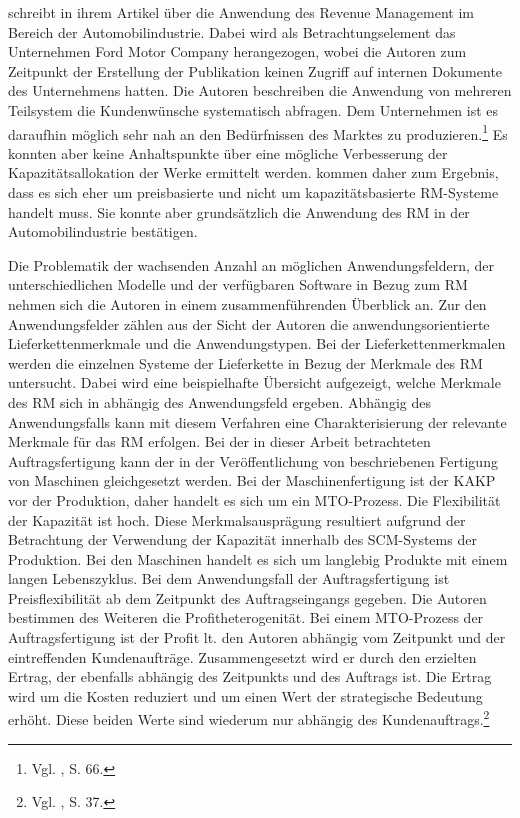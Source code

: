 \cite{Specht:2008aa} schreibt in ihrem Artikel über die Anwendung des Revenue Management im Bereich der Automobilindustrie. Dabei wird als Betrachtungselement das Unternehmen \glqq Ford Motor {Company\grqq} herangezogen, wobei die Autoren zum Zeitpunkt der Erstellung der Publikation keinen Zugriff auf internen Dokumente des Unternehmens hatten. Die Autoren beschreiben die Anwendung von mehreren Teilsystem die Kundenwünsche systematisch abfragen. Dem Unternehmen ist es daraufhin möglich sehr nah an den Bedürfnissen des Marktes zu produzieren.\footnote{Vgl. \cite{Specht:2008aa}, S. 66.} Es konnten aber keine Anhaltspunkte über eine mögliche Verbesserung der Kapazitätsallokation der Werke ermittelt werden. \cite{Specht:2008aa} kommen daher zum Ergebnis, dass es sich eher um preisbasierte und nicht um kapazitätsbasierte RM-Systeme handelt muss. Sie konnte aber grundsätzlich die Anwendung des RM in der Automobilindustrie bestätigen.

Die Problematik der wachsenden Anzahl an möglichen Anwendungsfeldern, der unterschiedlichen Modelle und der verfügbaren Software in Bezug zum RM nehmen sich die Autoren \cite{quante2009revenue} in einem zusammenführenden Überblick an. Zur den Anwendungsfelder zählen aus der Sicht der Autoren die anwendungsorientierte Lieferkettenmerkmale und die Anwendungstypen. Bei der Lieferkettenmerkmalen werden die einzelnen Systeme der Lieferkette in Bezug der Merkmale des RM untersucht. Dabei wird eine beispielhafte Übersicht aufgezeigt, welche Merkmale des RM sich in abhängig des Anwendungsfeld ergeben. Abhängig des Anwendungsfalls kann mit diesem Verfahren eine Charakterisierung der relevante Merkmale für das RM erfolgen. Bei der in dieser Arbeit betrachteten Auftragsfertigung kann der in der Veröffentlichung von \cite{quante2009revenue} beschriebenen Fertigung von Maschinen gleichgesetzt werden. Bei der Maschinenfertigung ist der KAKP vor der Produktion, daher handelt es sich um ein MTO-Prozess. Die Flexibilität der Kapazität ist hoch. Diese Merkmalsausprägung resultiert aufgrund der Betrachtung der Verwendung der Kapazität innerhalb des SCM-Systems der Produktion. Bei den Maschinen handelt es sich um langlebig Produkte mit einem langen Lebenszyklus. Bei dem Anwendungsfall der Auftragsfertigung ist Preisflexibilität ab dem Zeitpunkt des Auftragseingangs gegeben. Die Autoren bestimmen des Weiteren die Profitheterogenität. Bei einem MTO-Prozess der Auftragsfertigung ist der Profit lt. den Autoren abhängig vom Zeitpunkt und der eintreffenden Kundenaufträge. Zusammengesetzt wird er durch den erzielten Ertrag, der ebenfalls abhängig des Zeitpunkts und des Auftrags ist. Die Ertrag wird um die Kosten reduziert und um einen Wert der strategische Bedeutung erhöht. Diese beiden Werte sind wiederum nur abhängig des Kundenauftrags.\footnote{Vgl. \cite{quante2009revenue}, S. 37.}

